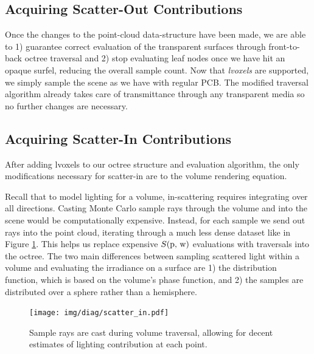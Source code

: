 \documentclass[12pt]{ucthesis}
\newcommand{\captionfonts}{\small\bf\ssp}
\begin{document}
\subsection{Acquiring Scatter-Out Contributions}
\label{scatterout_sec}

Once the changes to the point-cloud data-structure have been made, we are able to 1) guarantee correct evaluation of the transparent surfaces through front-to-back octree traversal and 2) stop evaluating leaf nodes once we have hit an opaque surfel, reducing the overall sample count.  Now that \textit{lvoxels} are supported, we simply sample the scene as we have with regular PCB.  The modified traversal algorithm already takes care of transmittance through any transparent media so no further changes are necessary.

\subsection{Acquiring Scatter-In Contributions}
\label{scatterin_sec}
After adding lvoxels to our octree structure and evaluation algorithm, the only modifications necessary for scatter-in are to the volume rendering equation.  

Recall that to model lighting for a volume, in-scattering requires integrating over all directions.  Casting Monte Carlo sample rays through the volume and into the scene would be computationally expensive.  Instead, for each sample we send out rays into the point cloud, iterating through a much less dense dataset like in Figure \ref{fig:scatter_in}.  This helps us replace expensive $S(\textup{p, w})$ evaluations with traversals into the octree.  The two main differences between sampling scattered light within a volume and evaluating the irradiance on a surface are 1) the distribution function, which is based on the volume's phase function, and 2) the samples are distributed over a sphere rather than a hemisphere.

\begin{figure}[h!]
    \centering
    \texttt{[image: img/diag/scatter\_in.pdf]}
    \captionfonts
    \caption{Sample rays are cast during volume traversal, allowing for decent estimates of lighting contribution at each point.}
    \label{fig:scatter_in}
\end{figure}


\end{document}
